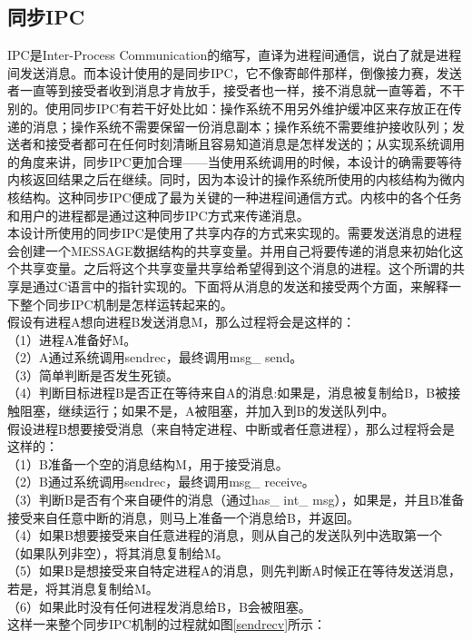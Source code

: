 \documentclass[UTF8,nofonts,cs4size]{ctexrep}
\begin{document}
\subsection{同步IPC}
IPC是Inter-Process Communication的缩写，直译为进程间通信，说白了就是进程间发送消息。而本设计使用的是同步IPC，它不像寄邮件那样，倒像接力赛，发送者一直等到接受者收到消息才肯放手，接受者也一样，接不消息就一直等着，不干别的。使用同步IPC有若干好处比如：操作系统不用另外维护缓冲区来存放正在传递的消息；操作系统不需要保留一份消息副本；操作系统不需要维护接收队列；发送者和接受者都可在任何时刻清晰且容易知道消息是怎样发送的；从实现系统调用的角度来讲，同步IPC更加合理——当使用系统调用的时候，本设计的确需要等待内核返回结果之后在继续。同时，因为本设计的操作系统所使用的内核结构为微内核结构。这种同步IPC便成了最为关键的一种进程间通信方式。内核中的各个任务和用户的进程都是通过这种同步IPC方式来传递消息。
\\
\indent  
本设计所使用的同步IPC是使用了共享内存的方式来实现的。需要发送消息的进程会创建一个MESSAGE数据结构的共享变量。并用自己将要传递的消息来初始化这个共享变量。之后将这个共享变量共享给希望得到这个消息的进程。这个所谓的共享是通过C语言中的指针实现的。下面将从消息的发送和接受两个方面，来解释一下整个同步IPC机制是怎样运转起来的。
\\
\indent  假设有进程A想向进程B发送消息M，那么过程将会是这样的：
\\ \indent （1）进程A准备好M。
\\ \indent （2）A通过系统调用sendrec，最终调用msg\_ send。
\\ \indent （3）简单判断是否发生死锁。
\\ \indent （4）判断目标进程B是否正在等待来自A的消息:如果是，消息被复制给B，B被接触阻塞，继续运行；如果不是，A被阻塞，并加入到B的发送队列中。
\\
\indent 假设进程B想要接受消息（来自特定进程、中断或者任意进程），那么过程将会是这样的：
\\ \indent （1）B准备一个空的消息结构M，用于接受消息。
\\ \indent （2）B通过系统调用sendrec，最终调用msg\_ receive。
\\ \indent （3）判断B是否有个来自硬件的消息（通过has\_ int\_ msg），如果是，并且B准备接受来自任意中断的消息，则马上准备一个消息给B，并返回。
\\ \indent （4）如果B想要接受来自任意进程的消息，则从自己的发送队列中选取第一个（如果队列非空），将其消息复制给M。
\\ \indent （5）如果B是想接受来自特定进程A的消息，则先判断A时候正在等待发送消息，若是，将其消息复制给M。
\\ \indent （6）如果此时没有任何进程发消息给B，B会被阻塞。
\\
\indent 这样一来整个同步IPC机制的过程就如图\ref{sendrecv}所示：
\end{document}
